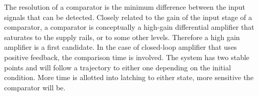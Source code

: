 The resolution of a comparator is the minimum difference between the input signals that can be detected. Closely related to the gain of the input stage of a comparator, a comparator is conceptually a high-gain differential amplifier that saturates to the supply rails, or to some other levels. Therefore a high gain amplifier is a first candidate. In the case of closed-loop amplifier that uses positive feedback, the comparison time is involved. The system has two stable points and will follow a trajectory to either one depending on the initial condition. More time is allotted into latching to either state, more sensitive the comparator will be.





